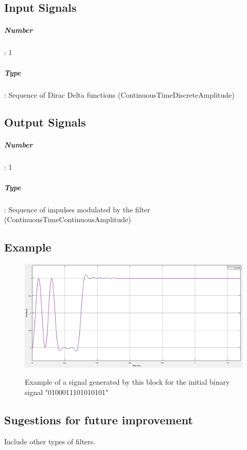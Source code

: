 \documentclass[a4paper]{article}
\begin{document}
\subsection*{Input Signals}

\subparagraph*{Number}: 1

\subparagraph*{Type}: Sequence of Dirac Delta functions (ContinuousTimeDiscreteAmplitude)

\subsection*{Output Signals}

\subparagraph*{Number}: 1

\subparagraph*{Type}: Sequence of impulses modulated by the filter (ContinuousTimeContinuousAmplitude)

\subsection*{Example}

\begin{figure}[h]
	\centering
	\includegraphics[width=\textwidth]{MQAM6_DeterministicAppendZeros}
	\label{MQAM6_DeterministicAppendZeros}\caption{Example of a signal generated by this block for the initial binary signal "0100011101010101"}
\end{figure}

\subsection*{Sugestions for future improvement}

Include other types of filters.
\end{document}
